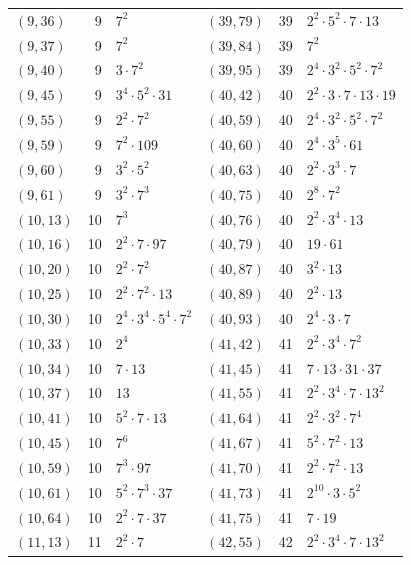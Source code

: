 \documentclass[11pt]{article}
\begin{document}
\begin{longtable}{@{}lrl@{\qquad}lrl@{}}
$(9,36)$ & 9 & $7^{2}$ & $(39,79)$ & 39 & $2^{2}\cdot 5^{2}\cdot 7\cdot 13$\\
$(9,37)$ & 9 & $7^{2}$ & $(39,84)$ & 39 & $7^{2}$\\
$(9,40)$ & 9 & $3\cdot 7^{2}$ & $(39,95)$ & 39 & $2^{4}\cdot 3^{2}\cdot 5^{2}\cdot 7^{2}$\\
$(9,45)$ & 9 & $3^{4}\cdot 5^{2}\cdot 31$ & $(40,42)$ & 40 & $2^{2}\cdot 3\cdot 7\cdot 13\cdot 19$\\
$(9,55)$ & 9 & $2^{2}\cdot 7^{2}$ & $(40,59)$ & 40 & $2^{4}\cdot 3^{2}\cdot 5^{2}\cdot 7^{2}$\\
$(9,59)$ & 9 & $7^{2}\cdot 109$ & $(40,60)$ & 40 & $2^{4}\cdot 3^{5}\cdot 61$\\
$(9,60)$ & 9 & $3^{2}\cdot 5^{2}$ & $(40,63)$ & 40 & $2^{2}\cdot 3^{3}\cdot 7$\\
$(9,61)$ & 9 & $3^{2}\cdot 7^{3}$ & $(40,75)$ & 40 & $2^{8}\cdot 7^{2}$\\
$(10,13)$ & 10 & $7^{3}$ & $(40,76)$ & 40 & $2^{2}\cdot 3^{4}\cdot 13$\\
$(10,16)$ & 10 & $2^{2}\cdot 7\cdot 97$ & $(40,79)$ & 40 & $19\cdot 61$\\
$(10,20)$ & 10 & $2^{2}\cdot 7^{2}$ & $(40,87)$ & 40 & $3^{2}\cdot 13$\\
$(10,25)$ & 10 & $2^{2}\cdot 7^{2}\cdot 13$ & $(40,89)$ & 40 & $2^{2}\cdot 13$\\
$(10,30)$ & 10 & $2^{4}\cdot 3^{4}\cdot 5^{4}\cdot 7^{2}$ & $(40,93)$ & 40 & $2^{4}\cdot 3\cdot 7$\\
$(10,33)$ & 10 & $2^{4}$ & $(41,42)$ & 41 & $2^{2}\cdot 3^{4}\cdot 7^{2}$\\
$(10,34)$ & 10 & $7\cdot 13$ & $(41,45)$ & 41 & $7\cdot 13\cdot 31\cdot 37$\\
$(10,37)$ & 10 & $13$ & $(41,55)$ & 41 & $2^{2}\cdot 3^{4}\cdot 7\cdot 13^{2}$\\
$(10,41)$ & 10 & $5^{2}\cdot 7\cdot 13$ & $(41,64)$ & 41 & $2^{2}\cdot 3^{2}\cdot 7^{4}$\\
$(10,45)$ & 10 & $7^{6}$ & $(41,67)$ & 41 & $5^{2}\cdot 7^{2}\cdot 13$\\
$(10,59)$ & 10 & $7^{3}\cdot 97$ & $(41,70)$ & 41 & $2^{2}\cdot 7^{2}\cdot 13$\\
$(10,61)$ & 10 & $5^{2}\cdot 7^{3}\cdot 37$ & $(41,73)$ & 41 & $2^{10}\cdot 3\cdot 5^{2}$\\
$(10,64)$ & 10 & $2^{2}\cdot 7\cdot 37$ & $(41,75)$ & 41 & $7\cdot 19$\\
$(11,13)$ & 11 & $2^{2}\cdot 7$ & $(42,55)$ & 42 & $2^{2}\cdot 3^{4}\cdot 7\cdot 13^{2}$\\

\end{longtable}
\end{document}
